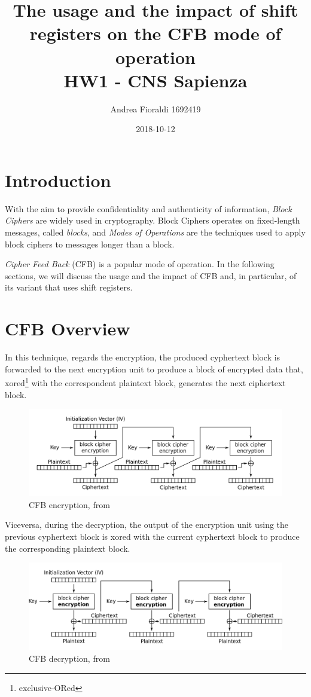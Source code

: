\documentclass[11pt]{article}
\title{{\bf The usage and the impact of shift registers on the CFB mode of operation} \\ \bigskip \large HW1 - CNS Sapienza}
\date{2018-10-12}
\author{Andrea Fioraldi 1692419}
\begin{document}
\maketitle

\section{Introduction}

With the aim to provide confidentiality and authenticity of information, {\em Block Ciphers} are widely used in cryptography. Block Ciphers operates on fixed-length messages, called {\em blocks}, and {\em Modes of Operations} are the techniques used to apply block ciphers to messages longer than a block.

{\em Cipher Feed Back} (CFB) is a popular mode of operation.
In the following sections, we will discuss the usage and the impact of CFB and, in particular, of its variant that uses shift registers.

\section{CFB Overview}

In this technique, regards the encryption, the produced cyphertext block is forwarded to the next encryption unit to produce a block of encrypted data that, xored\footnote{exclusive-ORed} with the correspondent plaintext block, generates the next ciphertext block. 

\begin{figure}[!ht]
  \centering
  \includegraphics[width=1\textwidth]{pic1-hw1-1692419}
  \caption{CFB encryption, from \cite{wiki}}
  \label{fig:cfb_enc}
\end{figure}

Viceversa, during the decryption, the output of the encryption unit using the previous cyphertext block is xored with the current cyphertext block to produce the corresponding plaintext block.

\begin{figure}[!ht]
  \centering
  \includegraphics[width=1\textwidth]{pic2-hw1-1692419}
  \caption{CFB decryption, from \cite{wiki}}
  \label{fig:cfb_dec}
\end{figure}
\end{document}
